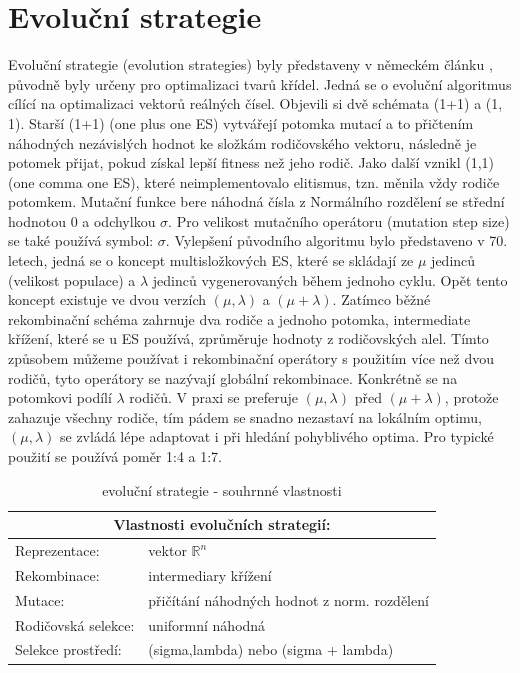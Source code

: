 \section{Evoluční strategie}
\label{sec:ES}
Evoluční strategie (evolution strategies) byly představeny v německém článku \cite{rechenberg1981evolutionsstrategie}, původně byly určeny pro optimalizaci tvarů křídel. Jedná se o evoluční algoritmus cílící na optimalizaci vektorů reálných čísel. Objevili si dvě schémata (1+1) a (1, 1). Starší (1+1) (one plus one ES) vytvářejí potomka mutací a to přičtením náhodných nezávislých hodnot ke složkám rodičovského vektoru, následně je potomek přijat, pokud získal lepší fitness než jeho rodič. Jako další vznikl (1,1) (one comma one ES), které neimplementovalo elitismus, tzn. měnila vždy rodiče potomkem. Mutační funkce bere náhodná čísla z Normálního rozdělení se střední hodnotou 0 a odchylkou $\sigma$. Pro velikost mutačního operátoru (mutation step size) se také používá symbol: $\sigma$. Vylepšení původního algoritmu bylo představeno v 70. letech, jedná se o koncept multisložkových ES, které se skládají ze $\mu$ jedinců (velikost populace) a $\lambda$ jedinců vygenerovaných během jednoho cyklu. Opět tento koncept existuje ve dvou verzích $(\mu,\lambda)$ a $(\mu + \lambda)$. Zatímco běžné rekombinační schéma zahrnuje dva rodiče a jednoho potomka, intermediate křížení, které se u ES používá, zprůměruje hodnoty z rodičovských alel. Tímto způsobem můžeme používat i rekombinační operátory s použitím více než dvou rodičů, tyto operátory se nazývají globální rekombinace. Konkrétně se na potomkovi podílí $\lambda$ rodičů. V praxi se preferuje $(\mu,\lambda)$ před $(\mu + \lambda)$, protože zahazuje všechny rodiče, tím pádem se snadno nezastaví na lokálním optimu, $(\mu,\lambda)$ se zvládá lépe adaptovat i při hledání pohyblivého optima. Pro typické použití se používá poměr 1:4 a 1:7. 
\begin{table}[h]\centering
  \begin{tabular}{ l l }
      \multicolumn{2}{c}{Vlastnosti evolučních strategií:} \\
      \hline \hline
      Reprezentace: & vektor $\mathbb{R}^n$ \\
      \hline  
      Rekombinace: & intermediary křížení \\
      \hline  
      Mutace: & přičítání náhodných hodnot z norm. rozdělení \\
      \hline   
      Rodičovská selekce: & uniformní náhodná \\
      \hline   
      Selekce prostředí: & (sigma,lambda) nebo (sigma + lambda) \\
    \end{tabular} 
\caption{evoluční strategie - souhrnné vlastnosti}
  \end{table} 

